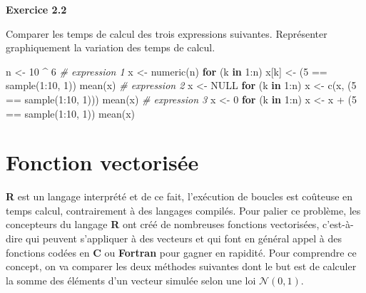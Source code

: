 \documentclass[
]{book}
\newenvironment{Shaded}{\begin{snugshade}}{\end{snugshade}}
\newcommand{\CommentTok}[1]{\textcolor[rgb]{0.56,0.35,0.01}{\textit{#1}}}
\newcommand{\ConstantTok}[1]{\textcolor[rgb]{0.00,0.00,0.00}{#1}}
\newcommand{\ControlFlowTok}[1]{\textcolor[rgb]{0.13,0.29,0.53}{\textbf{#1}}}
\newcommand{\DecValTok}[1]{\textcolor[rgb]{0.00,0.00,0.81}{#1}}
\newcommand{\FunctionTok}[1]{\textcolor[rgb]{0.00,0.00,0.00}{#1}}
\newcommand{\NormalTok}[1]{#1}
\newcommand{\OtherTok}[1]{\textcolor[rgb]{0.56,0.35,0.01}{#1}}
\newcommand{\SpecialCharTok}[1]{\textcolor[rgb]{0.00,0.00,0.00}{#1}}
\theoremstyle{definition}
\theoremstyle{definition}
\theoremstyle{definition}
\theoremstyle{definition}
\theoremstyle{remark}
\begin{document}
\textbf{Exercice 2.2}

Comparer les temps de calcul des trois expressions suivantes. Représenter graphiquement la variation des temps de calcul.

\begin{Shaded}
\begin{Highlighting}[]
\NormalTok{n }\OtherTok{\textless{}{-}} \DecValTok{10} \SpecialCharTok{\^{}} \DecValTok{6}
\CommentTok{\# expression 1}
\NormalTok{x }\OtherTok{\textless{}{-}} \FunctionTok{numeric}\NormalTok{(n)}
\ControlFlowTok{for}\NormalTok{ (k }\ControlFlowTok{in} \DecValTok{1}\SpecialCharTok{:}\NormalTok{n) }
\NormalTok{  x[k] }\OtherTok{\textless{}{-}}\NormalTok{ (}\DecValTok{5} \SpecialCharTok{==} \FunctionTok{sample}\NormalTok{(}\DecValTok{1}\SpecialCharTok{:}\DecValTok{10}\NormalTok{, }\DecValTok{1}\NormalTok{))}
\FunctionTok{mean}\NormalTok{(x)}
\CommentTok{\# expression 2}
\NormalTok{x }\OtherTok{\textless{}{-}} \ConstantTok{NULL}
\ControlFlowTok{for}\NormalTok{ (k }\ControlFlowTok{in} \DecValTok{1}\SpecialCharTok{:}\NormalTok{n) }
\NormalTok{  x }\OtherTok{\textless{}{-}} \FunctionTok{c}\NormalTok{(x, (}\DecValTok{5} \SpecialCharTok{==} \FunctionTok{sample}\NormalTok{(}\DecValTok{1}\SpecialCharTok{:}\DecValTok{10}\NormalTok{, }\DecValTok{1}\NormalTok{)))}
\FunctionTok{mean}\NormalTok{(x)}
\CommentTok{\# expression 3}
\NormalTok{x }\OtherTok{\textless{}{-}} \DecValTok{0}
\ControlFlowTok{for}\NormalTok{ (k }\ControlFlowTok{in} \DecValTok{1}\SpecialCharTok{:}\NormalTok{n)}
\NormalTok{  x }\OtherTok{\textless{}{-}}\NormalTok{ x }\SpecialCharTok{+}\NormalTok{ (}\DecValTok{5} \SpecialCharTok{==} \FunctionTok{sample}\NormalTok{(}\DecValTok{1}\SpecialCharTok{:}\DecValTok{10}\NormalTok{, }\DecValTok{1}\NormalTok{))}
\FunctionTok{mean}\NormalTok{(x)}
\end{Highlighting}
\end{Shaded}

\hypertarget{fonction-vectorisuxe9e}{%
\section{Fonction vectorisée}\label{fonction-vectorisuxe9e}}

\textbf{R} est un langage interprété et de ce fait, l'exécution de boucles est coûteuse en temps calcul, contrairement à des langages compilés. Pour palier ce problème, les concepteurs du langage \textbf{R} ont créé de nombreuses fonctions vectorisées, c'est-à-dire qui peuvent s'appliquer à des vecteurs et qui font en général appel à des fonctions codées en \textbf{C} ou \textbf{Fortran} pour gagner en rapidité. Pour comprendre ce concept, on va comparer les deux méthodes suivantes dont le but est de calculer la somme des éléments d'un vecteur simulée selon une loi \(\mathcal{N}(0,1)\).
\end{document}
